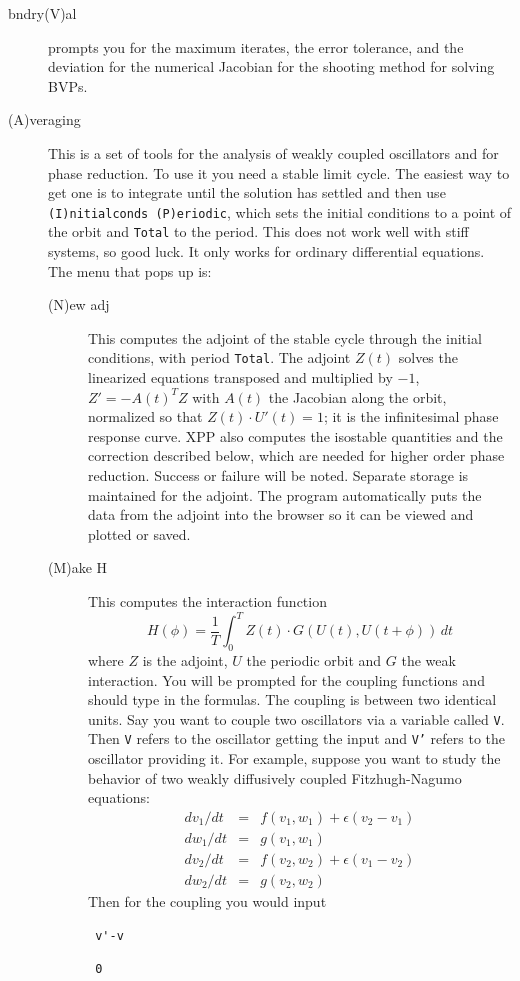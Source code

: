 \documentclass{article}
\newcommand{\beqa}{\begin{eqnarray}}
\newcommand{\eeqa}{\end{eqnarray}}
\newcommand{\bvb}{\begin{verbatim}}
\newcommand{\tc}[1]{\addcontentsline{toc}{subsection}{#1}}
\begin{document}
\begin{description}
\item[bndry(V)al] prompts you for the maximum iterates, the error tolerance, and the
 deviation for the numerical Jacobian for the shooting method for solving BVPs.
\tc{Averaging}\item[(A)veraging]  This is a set of tools for the analysis of weakly coupled oscillators and for phase reduction.
To use it you need a stable limit cycle.  The easiest way to get one is to integrate until the solution has settled and then use
{\tt (I)nitialconds (P)eriodic}, which sets the initial conditions to a point of the orbit and {\tt Total} to the period.
This does not work well with stiff systems, so good luck.  It only works for ordinary differential equations.  The menu that pops up is:
\begin{description}
\item[(N)ew adj]  This computes the adjoint of the stable cycle through the initial conditions, with period {\tt Total}.  The adjoint $Z(t)$
solves the linearized equations transposed and multiplied by $-1$, $Z'=-A(t)^TZ$ with $A(t)$ the Jacobian along the orbit, normalized so that
$Z(t)\cdot U'(t)=1$; it is the infinitesimal phase response curve.  XPP also computes the isostable quantities and the correction
described below, which are needed for higher order phase reduction.  Success or failure will be noted. Separate storage is
maintained for the adjoint.  The program automatically puts the data from the adjoint into the browser so it can be viewed and plotted or
saved.
\item[(M)ake H] This computes the interaction function
\[
H(\phi) = \frac{1}{T}\int_0^T Z(t)\cdot G(U(t),U(t+\phi))\,dt
\]
where $Z$ is the adjoint, $U$ the periodic orbit and $G$ the weak interaction.  You will be prompted for the coupling functions and
should type in the formulas.  The coupling is between two identical
units.  Say you want to couple two oscillators via a variable called
{\tt V}. Then {\tt V} refers to the oscillator getting the input
and {\tt V'} refers to the oscillator providing it.
  For example, suppose you want to study
the behavior of two weakly diffusively coupled Fitzhugh-Nagumo
equations:
\beqa
	dv_1/dt &=& f(v_1,w_1)+\epsilon (v_2-v_1) \\
	dw_1/dt &=& g(v_1,w_1) \\
	dv_2/dt &=& f(v_2,w_2)+\epsilon (v_1-v_2) \\
	dw_2/dt &=& g(v_2,w_2) 
\eeqa
Then for the coupling you would input
\bvb
 v'-v
\end{verbatim}
\bvb
 0
\end{verbatim}

\end{description}
\end{description}
\end{document}
